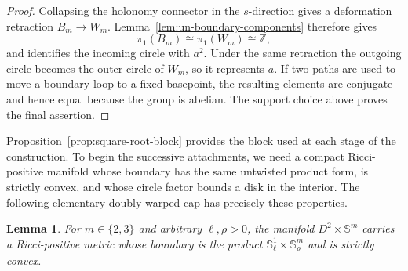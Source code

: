 \documentclass[11pt,reqno]{amsart}
\newtheorem{lemma}[theorem]{Lemma}
\theoremstyle{definition}
\numberwithin{equation}{section}
\begin{document}
\begin{proof}
Collapsing the holonomy connector in the \(s\)-direction gives a deformation
retraction \(B_m\to W_m\).  Lemma~\ref{lem:un-boundary-components}
therefore gives
\[
 \pi_1(B_m)\cong\pi_1(W_m)\cong\mathbb Z,
\]
and identifies the incoming circle with \(a^2\).  Under the same
retraction the outgoing circle becomes the outer circle of \(W_m\), so
it represents \(a\).  If two paths are used to move a boundary loop to
a fixed basepoint, the resulting elements are conjugate and hence equal
because the group is abelian.  The support choice above proves the
final assertion.
\end{proof}

Proposition~\ref{prop:square-root-block} provides the block used at each
stage of the construction.  To begin the successive attachments, we need
a compact
Ricci-positive manifold whose boundary has the same untwisted product
form, is strictly convex, and whose circle factor bounds a disk in the
interior.  The following elementary doubly warped cap has precisely
these properties.

\begin{lemma}
\label{lem:un-cap}
For \(m\in\{2,3\}\) and arbitrary \(\ell,\rho>0\), the manifold
\(D^2\times\mathbb S^m\) carries a Ricci-positive metric whose boundary is the
product \(\mathbb S^1_\ell\times\mathbb S^m_\rho\) and is strictly convex.
\end{lemma}
\end{document}
